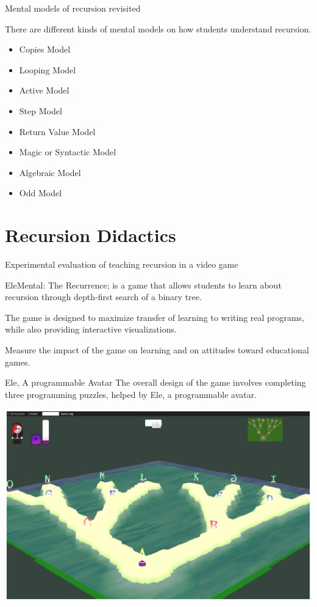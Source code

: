 \begin{frame}{Mental models of recursion revisited}
  
  There are different kinds of mental models on how students understand
  recursion.
  
  \begin{itemize}
  \item Copies Model
  \item Looping Model
  \item Active Model
  \item Step Model
  \item Return Value Model
  \item Magic or Syntactic Model
  \item Algebraic Model
  \item Odd Model
  \end{itemize}
\end{frame}


\section{Recursion Didactics}

\begin{frame}{Experimental evaluation of teaching recursion in a video game}
  
  EleMental: The Recurrence; is a game that allows students to learn about
  recursion through depth-first search of a binary tree.
  \medskip
  
  The game is designed to maximize transfer of learning to writing real
  programs, while also providing interactive visualizations.
  \medskip
  
  Measure the impact of the game on learning and on attitudes toward
  educational games.
  \medskip
\end{frame}

\begin{frame} {Ele, A programmable Avatar}
  The overall design of the game involves completing three
  programming puzzles, helped by Ele, a programmable avatar.
  \medskip
  
  \includegraphics[scale=0.7]{img/ele.png}
\end{frame}

